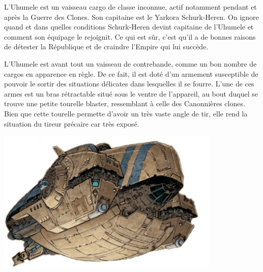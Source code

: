 \documentclass{jdrp}
\begin{document}
	L'Uhumele est un vaisseau cargo de classe inconnue, actif notamment pendant et après la Guerre des Clones. Son capitaine est le Yarkora Schurk-Heren. On ignore quand et dans quelles conditions Schurk-Heren devint capitaine de l’Uhumele et comment son équipage le rejoignit. Ce qui est sûr, c'est qu’il a de bonnes raisons de détester la République et de craindre l’Empire qui lui succède.

	L’Uhumele est avant tout un vaisseau de contrebande, comme un bon nombre de cargos en apparence en règle. De ce fait, il est doté d’un armement susceptible de pouvoir le sortir des situations délicates dans lesquelles il se fourre. L’une de ces armes est un bras rétractable situé sous le ventre de l’appareil, au bout duquel se trouve une petite tourelle blaster, ressemblant à celle des Canonnières clones. Bien que cette tourelle permette d’avoir un très vaste angle de tir, elle rend la situation du tireur précaire car très exposé. 

	\hspace{12em}
	\includegraphics[width=0.8\textwidth]{_img/uhumele.png}
	

	\onecolumn
	\nocite{*}
	\printbibliography
\end{document}

